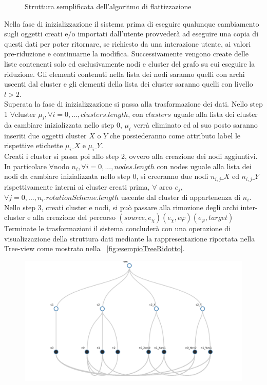 {\begin{figure}[!htb]
\begin{center}
	\end{center}
	\caption{Struttura semplificata dell'algoritmo di flattizzazione \label{fig:flatAlg}}
\end{figure}
Nella fase di inizializzazione il sistema prima di eseguire qualunque cambiamento sugli oggetti creati e/o importati dall'utente provvederà ad eseguire una copia di questi dati per poter ritornare, se richiesto da una interazione utente, ai valori pre-riduzione e continuarne la modifica. Successivamente vengono create delle liste contenenti solo ed esclusivamente nodi e cluster del grafo su cui eseguire la riduzione. Gli elementi contenuti nella lista dei nodi saranno quelli con archi uscenti dal cluster e gli elementi della lista dei cluster saranno quelli con livello $l>2$.\\
Superata la fase di inizializzazione si passa alla trasformazione dei dati. Nello step 1 $\forall$cluster $\mu_i, \forall i=0,...,clusters.length$, con $clusters$ uguale alla lista dei cluster da cambiare inizializzata nello step 0, $\mu_i$ verrà eliminato ed al suo posto saranno inseriti due oggetti cluster $X$ o $Y$ che possiederanno come attributo label le rispettive etichette $\mu_i\_X$ e $\mu_i\_Y$.\\ 
Creati i cluster si passa poi allo step 2, ovvero alla creazione dei nodi aggiuntivi. In particolare $\forall$nodo $n_i, \forall i=0,...,nodes.length$ con nodes uguale alla lista dei nodi da cambiare inizializzata nello step 0, si creeranno due nodi $n_{i,j}\_X$ ed $n_{i,j}\_Y$ rispettivamente interni ai cluster creati prima, $\forall$ arco $e_j$, $\forall j=0,..., n_i.rotationScheme.length$ uscente dal cluster di appartenenza di $n_i$.\\
Nello step 3, creati cluster e nodi, si può passare alla rimozione degli archi inter-cluster e alla creazione del percorso $(source, e_\chi)(e_\chi, e\varphi) (e_\varphi, target)$
Terminate le trasformazioni il sistema concluderà con una operazione di visualizzazione della struttura dati mediante la rappresentazione riportata nella Tree-view come mostrato nella \figurename~\ref{fig:esempioTreeRidotto}.
\begin{figure}[!htb]
	\begin{center}
		\includegraphics[width=1 \linewidth]{figure/esempioTreeRidotto}

\end{center}
\end{figure}}
